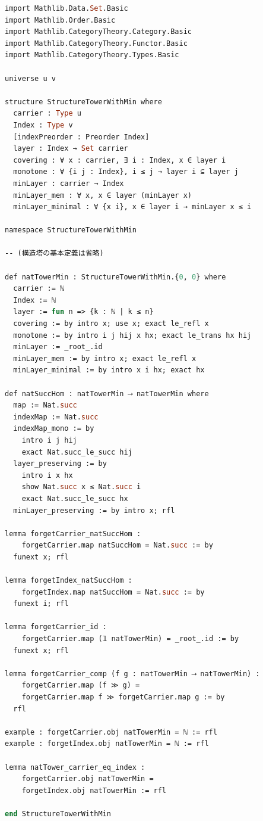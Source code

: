 \documentclass[a4paper,12pt]{article}
\theoremstyle{definition}
\begin{document}
\begin{lstlisting}[style=leanstyle, language=ML]
import Mathlib.Data.Set.Basic
import Mathlib.Order.Basic
import Mathlib.CategoryTheory.Category.Basic
import Mathlib.CategoryTheory.Functor.Basic
import Mathlib.CategoryTheory.Types.Basic

universe u v

structure StructureTowerWithMin where
  carrier : Type u
  Index : Type v
  [indexPreorder : Preorder Index]
  layer : Index → Set carrier
  covering : ∀ x : carrier, ∃ i : Index, x ∈ layer i
  monotone : ∀ {i j : Index}, i ≤ j → layer i ⊆ layer j
  minLayer : carrier → Index
  minLayer_mem : ∀ x, x ∈ layer (minLayer x)
  minLayer_minimal : ∀ {x i}, x ∈ layer i → minLayer x ≤ i

namespace StructureTowerWithMin

-- (構造塔の基本定義は省略)

def natTowerMin : StructureTowerWithMin.{0, 0} where
  carrier := ℕ
  Index := ℕ
  layer := fun n => {k : ℕ | k ≤ n}
  covering := by intro x; use x; exact le_refl x
  monotone := by intro i j hij x hx; exact le_trans hx hij
  minLayer := _root_.id
  minLayer_mem := by intro x; exact le_refl x
  minLayer_minimal := by intro x i hx; exact hx

def natSuccHom : natTowerMin ⟶ natTowerMin where
  map := Nat.succ
  indexMap := Nat.succ
  indexMap_mono := by
    intro i j hij
    exact Nat.succ_le_succ hij
  layer_preserving := by
    intro i x hx
    show Nat.succ x ≤ Nat.succ i
    exact Nat.succ_le_succ hx
  minLayer_preserving := by intro x; rfl

lemma forgetCarrier_natSuccHom :
    forgetCarrier.map natSuccHom = Nat.succ := by
  funext x; rfl

lemma forgetIndex_natSuccHom :
    forgetIndex.map natSuccHom = Nat.succ := by
  funext i; rfl

lemma forgetCarrier_id :
    forgetCarrier.map (𝟙 natTowerMin) = _root_.id := by
  funext x; rfl

lemma forgetCarrier_comp (f g : natTowerMin ⟶ natTowerMin) :
    forgetCarrier.map (f ≫ g) = 
    forgetCarrier.map f ≫ forgetCarrier.map g := by
  rfl

example : forgetCarrier.obj natTowerMin = ℕ := rfl
example : forgetIndex.obj natTowerMin = ℕ := rfl

lemma natTower_carrier_eq_index :
    forgetCarrier.obj natTowerMin = 
    forgetIndex.obj natTowerMin := rfl

end StructureTowerWithMin
\end{lstlisting}
\end{document}
